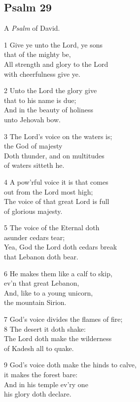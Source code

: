 \begin{multicols}{3}
\begin{center}
\quad{}\quad{}
\end{center}

\subsection*{Psalm 29}

A \emph{Psalm} of David.

1 Give ye unto the Lord, ye sons\\
that of the mighty be,\\
All strength and glory to the Lord\\
with cheerfulness give ye.

2 Unto the Lord the glory give\\
that to his name is due;\\
And in the beauty of holiness\\
unto Jehovah bow.

3 The Lord’s voice on the waters is;\\
the God of majesty\\
Doth thunder, and on multitudes\\
of waters sitteth he.

4 A pow’rful voice it is that comes\\
out from the Lord most high;\\
The voice of that great Lord is full\\
of glorious majesty.

5 The voice of the Eternal doth\\
asunder cedars tear;\\
Yea, God the Lord doth cedars break\\
that Lebanon doth bear.

6 He makes them like a calf to skip,\\
ev’n that great Lebanon,\\
And, like to a young unicorn,\\
the mountain Sirion.

7 God’s voice divides the flames of fire;\\
8 The desert it doth shake:\\
The Lord doth make the wilderness\\
of Kadesh all to quake.

9 God’s voice doth make the hinds to calve,\\
it makes the forest bare:\\
And in his temple ev’ry one\\
his glory doth declare.


\end{multicols}
